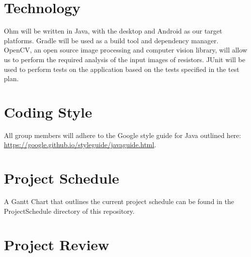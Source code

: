 \documentclass{article}
\begin{document}
\section{Technology}
Ohm will be written in Java, with the desktop and Android as our target platforms. Gradle will be used as a build tool and dependency manager. OpenCV, an open source image processing and computer vision library, will allow us to perform the required analysis of the input images of resistors. JUnit will be used to perform tests on the application based on the tests specified in the test plan.

\section{Coding Style}
All group members will adhere to the Google style guide for Java outlined here: \url{https://google.github.io/styleguide/javaguide.html}.


\section{Project Schedule}
A Gantt Chart that outlines the current project schedule can be found in the ProjectSchedule directory of this repository.

\section{Project Review}
\end{document}
